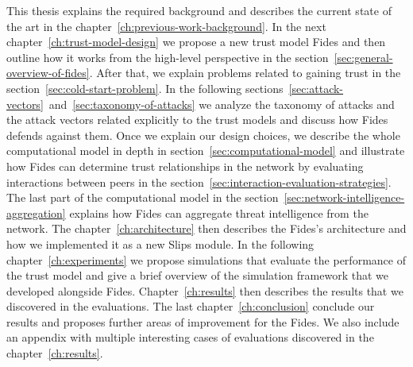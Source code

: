 This thesis explains the required background and describes the current state of the art in the chapter~\ref{ch:previous-work-background}.
In the next chapter~\ref{ch:trust-model-design} we propose a new trust model Fides and then outline how it works from the high-level perspective in the section~\ref{sec:general-overview-of-fides}.
After that, we explain problems related to gaining trust in the section~\ref{sec:cold-start-problem}.
In the following sections~\ref{sec:attack-vectors}~and~\ref{sec:taxonomy-of-attacks} we analyze the taxonomy of attacks and the attack vectors related explicitly to the trust models and discuss how Fides defends against them.
Once we explain our design choices, we describe the whole computational model in depth in section~\ref{sec:computational-model} and illustrate how Fides can determine trust relationships in the network by evaluating interactions between peers in the section~\ref{sec:interaction-evaluation-strategies}.
The last part of the computational model in the section~\ref{sec:network-intelligence-aggregation} explains how Fides can aggregate threat intelligence from the network.
The chapter~\ref{ch:architecture} then describes the Fides's architecture and how we implemented it as a new Slips module.
In the following chapter~\ref{ch:experiments} we propose simulations that evaluate the performance of the trust model and give a brief overview of the simulation framework that we developed alongside Fides.
Chapter~\ref{ch:results} then describes the results that we discovered in the evaluations. The last chapter~\ref{ch:conclusion} conclude our results and proposes further areas of improvement for the Fides. 
We also include an appendix with multiple interesting cases of evaluations discovered in the chapter~\ref{ch:results}.